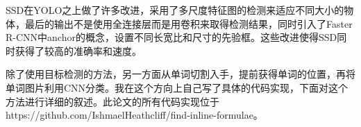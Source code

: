 SSD\parencite{ssd}在YOLO之上做了许多改进，采用了多尺度特征图的检测来适应不同大小的物体，最后的输出不是使用全连接层而是用卷积来取得检测结果，同时引入了Faster R-CNN中anchor的概念，设置不同长宽比和尺寸的先验框。这些改进使得SSD同时获得了较高的准确率和速度。

除了使用目标检测的方法，另一方面从单词切割入手，提前获得单词的位置，再将单词图片利用CNN分类。我在这个方向上自己写了具体的代码实现，下面对这个方法进行详细的叙述。此论文的所有代码实现位于https://github.com/IshmaelHeathcliff/find-inline-formulae。
